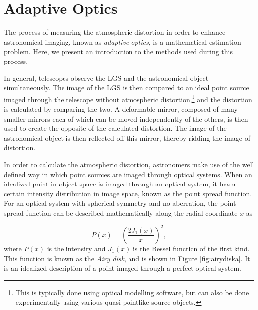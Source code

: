 
\chapter{Adaptive Optics}
The process of measuring the atmospheric distortion in order to enhance astronomical imaging, known as \textit{adaptive optics}, is a mathematical estimation problem. Here, we present an introduction to the methods used during this process.

In general, telescopes observe the LGS and the astronomical object simultaneously. The image of the LGS is then compared to an ideal point source imaged through the telescope without atmospheric distortion,\footnote{This is typically done using optical modelling software, but can also be done experimentally using various quasi-pointlike source objects.} and the distortion is calculated by comparing the two. A deformable mirror, composed of many smaller mirrors each of which can be moved independently of the others, is then used to create the opposite of the calculated distortion. The image of the astronomical object is then reflected off this mirror, thereby ridding the image of distortion.

In order to calculate the atmospheric distortion, astronomers make use of the well defined way in which point sources are imaged through optical systems. When an idealized point in object space is imaged through an optical system, it has a certain intensity distribution in image space, known as the point spread function. For an optical system with spherical symmetry and no aberration, the point spread function can be described mathematically along the radial coordinate $x$ as

\begin{equation}
	P(x) = \left(\frac{2 J_1(x)}{x}\right) ^{2},
  \label{psfa}
\end{equation}
%
where $P(x)$ is the intensity and $J_1(x)$ is the Bessel function of the first kind. This function is known as the \textit{Airy disk}, and is shown in Figure \ref{fig:airydiska}. It is an idealized description of a point imaged through a perfect optical system.





